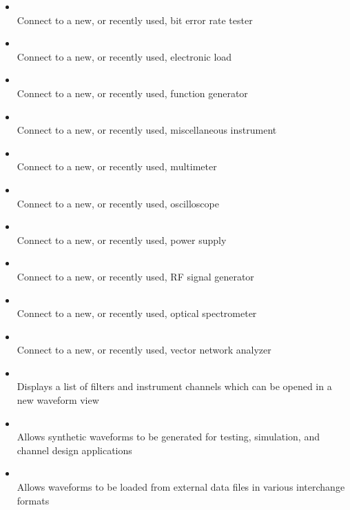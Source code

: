 \begin{itemize}

\item {}\\
Connect to a new, or recently used, bit error rate tester

\item {}\\
Connect to a new, or recently used, electronic load

\item {}\\
Connect to a new, or recently used, function generator

\item {}\\
Connect to a new, or recently used, miscellaneous instrument

\item {}\\
Connect to a new, or recently used, multimeter

\item {}\\
Connect to a new, or recently used, oscilloscope

\item {}\\
Connect to a new, or recently used, power supply

\item {}\\
Connect to a new, or recently used, RF signal generator

\item {}\\
Connect to a new, or recently used, optical spectrometer

\item {}\\
Connect to a new, or recently used, vector network analyzer

\item {}\\
Displays a list of filters and instrument channels which can be opened in a new waveform view

\item {}\\
Allows synthetic waveforms to be generated for testing, simulation, and channel design applications

\item {}\\
Allows waveforms to be loaded from external data files in various interchange formats

\end{itemize}

